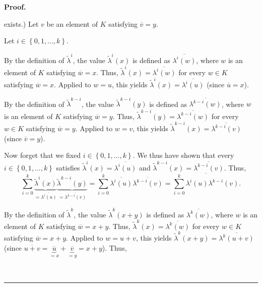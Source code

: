 \documentclass[numbers=enddot,12pt,final,onecolumn,notitlepage]{scrartcl}%
\newenvironment{proof}[1][Proof]{\noindent\textbf{#1.} }{\ \rule{0.5em}{0.5em}}
\begin{document}
\begin{proof}
{exists.) Let $v$ be an element of $K$ satisfying $\overline{v}=y$.
\par
Let $i\in\left\{  0,1,...,k\right\}  $.
\par
By the definition of $\widetilde{\lambda}^{i}$, the value $\widetilde{\lambda
}^{i}\left(  x\right)  $ is defined as $\overline{\lambda^{i}\left(  w\right)
}$, where $w$ is an element of $K$ satisfying $\overline{w}=x$. Thus,
$\widetilde{\lambda}^{i}\left(  x\right)  =\overline{\lambda^{i}\left(
w\right)  }$ for every $w\in K$ satisfying $\overline{w}=x$. Applied to $w=u$,
this yields $\widetilde{\lambda}^{i}\left(  x\right)  =\overline{\lambda
^{i}\left(  u\right)  }$ (since $\overline{u}=x$).
\par
By the definition of $\widetilde{\lambda}^{k-i}$, the value
$\widetilde{\lambda}^{k-i}\left(  y\right)  $ is defined as $\overline
{\lambda^{k-i}\left(  w\right)  }$, where $w$ is an element of $K$ satisfying
$\overline{w}=y$. Thus, $\widetilde{\lambda}^{k-i}\left(  y\right)
=\overline{\lambda^{k-i}\left(  w\right)  }$ for every $w\in K$ satisfying
$\overline{w}=y$. Applied to $w=v$, this yields $\widetilde{\lambda}%
^{k-i}\left(  x\right)  =\overline{\lambda^{k-i}\left(  v\right)  }$ (since
$\overline{v}=y$).
\par
Now forget that we fixed $i\in\left\{  0,1,...,k\right\}  $. We thus have
shown that every $i\in\left\{  0,1,...,k\right\}  $ satisfies
$\widetilde{\lambda}^{i}\left(  x\right)  =\overline{\lambda^{i}\left(
u\right)  }$ and $\widetilde{\lambda}^{k-i}\left(  x\right)  =\overline
{\lambda^{k-i}\left(  v\right)  }$. Thus,%
\[
\sum_{i=0}^{k}\underbrace{\widetilde{\lambda}^{i}\left(  x\right)
}_{=\overline{\lambda^{i}\left(  u\right)  }}\underbrace{\widetilde{\lambda
}^{k-i}\left(  y\right)  }_{=\overline{\lambda^{k-i}\left(  v\right)  }}%
=\sum_{i=0}^{k}\overline{\lambda^{i}\left(  u\right)  }\overline{\lambda
^{k-i}\left(  v\right)  }=\overline{\sum_{i=0}^{k}\lambda^{i}\left(  u\right)
\lambda^{k-i}\left(  v\right)  }.
\]
\par
By the definition of $\widetilde{\lambda}^{k}$, the value $\widetilde{\lambda
}^{k}\left(  x+y\right)  $ is defined as $\overline{\lambda^{k}\left(
w\right)  }$, where $w$ is an element of $K$ satisfying $\overline{w}=x+y$.
Thus, $\widetilde{\lambda}^{k}\left(  x\right)  =\overline{\lambda^{k}\left(
w\right)  }$ for every $w\in K$ satisfying $\overline{w}=x+y$. Applied to
$w=u+v$, this yields $\widetilde{\lambda}^{k}\left(  x+y\right)
=\overline{\lambda^{k}\left(  u+v\right)  }$ (since $\overline{u+v}%
=\underbrace{\overline{u}}_{=x}+\underbrace{\overline{v}}_{=y}=x+y$). Thus,%
}
\end{proof}
\end{document}
